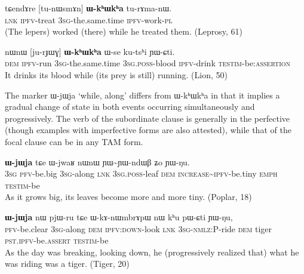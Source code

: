 \documentclass[oldfontcommands,oneside,a4paper,11pt]{article}
\newcommand{\ipa}[1]{{\phon \mbox{#1}}} %
\begin{document}
\begin{exe}
\ex \label{ex:WkhWkha1}
\gll
\ipa{tɕendɤre}  	[\ipa{tu-nɯsmɤn}]  	\textbf{\ipa{ɯ-kʰɯkʰa}}  	\ipa{tu-rɤma-nɯ.}  \\
\textsc{lnk} \textsc{ipfv}-treat \textsc{3sg}-the.same.time \textsc{ipfv}-work-\textsc{pl} \\
\glt (The lepers) worked (there) while he treated them. (Leprosy, 61)
\end{exe}
\begin{exe}
\ex \label{ex:WkhWkha2}
\gll
\ipa{nɯnɯ}  	[\ipa{ju-rɟɯɣ}]  	\textbf{\ipa{ɯ-kʰɯkʰa}}  	\ipa{ɯ-se}  	\ipa{ku-tsʰi}  	\ipa{ɲɯ-ɕti.}  \\
\textsc{dem} \textsc{ipfv}-run \textsc{3sg}-the.same.time \textsc{3sg.poss}-blood \textsc{ipfv}-drink  \textsc{testim}-be:\textsc{assertion} \\
\glt It drinks its blood while (its prey is still) running. (Lion, 50)
\end{exe}



The marker \ipa{ɯ-jɯja} `while, along'  differs from \ipa{ɯ-kʰɯkʰa} in that it implies a gradual change of state in both events occurring simultaneously and progressively. The verb of the subordinate clause is generally in the perfective (though examples with imperfective forms are also attested), while that of the focal clause can be in any TAM form.


\begin{exe}
\ex \label{ex:WjWja1}
\gll
[\ipa{ɯʑo}  	\ipa{tɤ-wxti}]  	\textbf{\ipa{ɯ-jɯja}}  	\ipa{tɕe}  	\ipa{ɯ-jwaʁ}  	\ipa{nɯnɯ}  	\ipa{ɲɯ\textasciitilde{}ɲɯ-ndɯβ}  	\ipa{ʑo}  	\ipa{ɲɯ-ŋu.}  	\\
\textsc{3sg} \textsc{pfv}-be.big  \textsc{3sg}-along \textsc{lnk} \textsc{3sg.poss}-leaf \textsc{dem} \textsc{increase\textasciitilde{}ipfv}-be.tiny \textsc{emph} \textsc{testim}-be \\
\glt As it grows big, its leaves become more and more tiny. (Poplar, 18)
\end{exe}

     \begin{exe}
   \ex \label{ex:khu}
   \gll  [\ipa{lɤ-fsoʁ}]  	\textbf{\ipa{ɯ-jɯja}}  	\ipa{nɯ}  	\ipa{pjɯ-ru}  	\ipa{tɕe}  	\ipa{ɯ-kɤ-nɯmbrɤpɯ}  	\ipa{nɯ}  	\ipa{kʰu}  	\ipa{pɯ-ɕti}  	\ipa{ɲɯ-ŋu,}  \\
\textsc{pfv}-be.clear    \textsc{3sg}-along  \textsc{dem} \textsc{ipfv:down}-look \textsc{lnk} \textsc{3sg-nmlz:P}-ride \textsc{dem} tiger \textsc{pst.ipfv}-be.\textsc{assert}  \textsc{testim}-be \\
\glt As the day was breaking, looking down, he (progressively realized that) what he was riding was a tiger. (Tiger, 20)
\end{exe}
\end{document}
